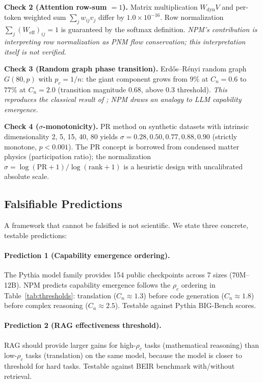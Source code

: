 \documentclass[11pt,a4paper]{article}
\newcommand{\Weff}{W_{\text{eff}}}
\begin{document}
\textbf{Check 2 (Attention row-sum $= 1$).}
Matrix multiplication $W_{\text{dyn}}V$ and per-token weighted sum $\sum_j w_{ij}v_j$ differ by $1.0\times10^{-16}$. Row normalization $\sum_j(\Weff)_{ij}=1$ is guaranteed by the softmax definition. \emph{NPM's contribution is interpreting row normalization as PNM flow conservation; this interpretation itself is not verified.}

\textbf{Check 3 (Random graph phase transition).}
Erd\H{o}s--R\'{e}nyi random graph $G(80,p)$ with $p_c=1/n$: the giant component grows from $9\%$ at $C_n{=}0.6$ to $77\%$ at $C_n{=}2.0$ (transition magnitude $0.68$, above $0.3$ threshold). \emph{This reproduces the classical result of \citet{erdos1960random}; NPM draws an analogy to LLM capability emergence.}

\textbf{Check 4 ($\sigma$-monotonicity).}
PR method on synthetic datasets with intrinsic dimensionality 2, 5, 15, 40, 80 yields $\sigma = 0.28, 0.50, 0.77, 0.88, 0.90$ (strictly monotone, $p<0.001$). The PR concept is borrowed from condensed matter physics (participation ratio); the normalization $\sigma = \log(\text{PR}+1)/\log(\text{rank}+1)$ is a heuristic design with uncalibrated absolute scale.

\subsection{Falsifiable Predictions}
\label{sec:predictions}
\label{sec:falsifiable}

A framework that cannot be falsified is not scientific.
We state three concrete, testable predictions:

\paragraph{Prediction 1 (Capability emergence ordering).}
The Pythia model family provides 154 public checkpoints across 7 sizes (70M--12B).
NPM predicts capability emergence follows the $\rho_c$ ordering in Table~\ref{tab:thresholds}:
translation ($C_n\approx 1.3$) before code generation ($C_n\approx 1.8$) before
complex reasoning ($C_n\approx 2.5$). Testable against Pythia BIG-Bench scores.

\paragraph{Prediction 2 (RAG effectiveness threshold).}
RAG should provide larger gains for high-$\rho_c$ tasks (mathematical reasoning)
than low-$\rho_c$ tasks (translation) on the same model, because the model is
closer to threshold for hard tasks. Testable against BEIR benchmark with/without retrieval.
\end{document}
